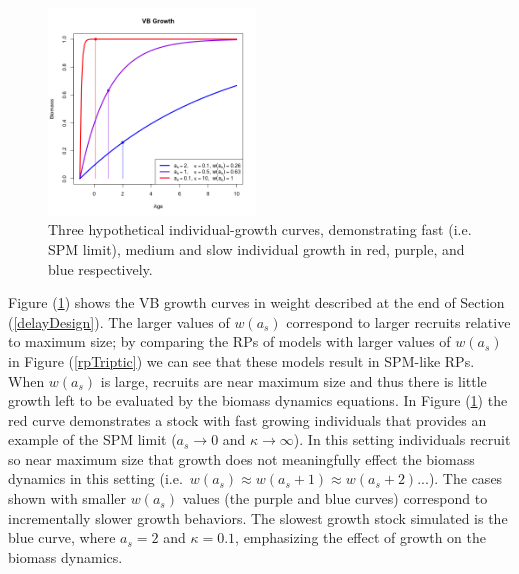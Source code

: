 \begin{figure}
\vspace{-1.5cm}
\includegraphics[width=0.49\textwidth]{../ddBias/vbCurves.png}
\caption{Three hypothetical individual-growth curves, demonstrating 
fast (i.e. SPM limit), medium and slow individual growth in red, 
purple, and blue respectively.
\label{vbCurves}}
\end{figure}
%
Figure (\ref{vbCurves}) shows the VB growth curves in weight
described at the end of Section (\ref{delayDesign}). %
The larger values of $w(a_s)$ correspond to larger recruits relative 
to maximum size; by comparing the RPs of models with larger values of 
$w(a_s)$ in Figure (\ref{rpTriptic}) we can see that these models result in SPM-like RPs.
When $w(a_s)$ is large, recruits are near maximum size and thus there is little growth left 
to be evaluated by the biomass dynamics equations. In Figure (\ref{vbCurves}) the red curve 
demonstrates a stock with fast growing individuals that provides an example of the SPM limit 
($a_s\rightarrow0$ and $\kappa\rightarrow\infty$). In this setting individuals recruit so near maximum size that 
growth does not meaningfully effect the biomass dynamics in this setting \mbox{(i.e. $w(a_s)\approx w(a_s+1)\approx w(a_s+2)...$).}
The cases shown with smaller $w(a_s)$ values (the purple and blue curves) correspond to 
incrementally slower growth behaviors. The slowest growth stock simulated is the blue curve, 
where $a_s=2$ and $\kappa=0.1$, emphasizing the effect of growth on the biomass dynamics. 

